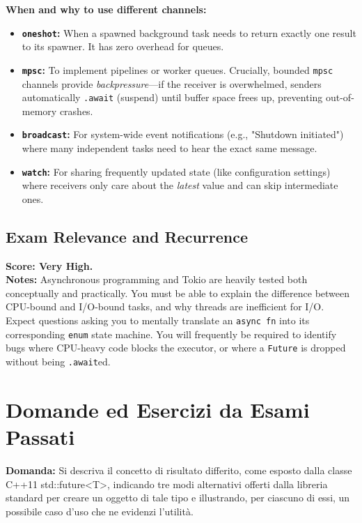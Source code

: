 \begin{usagebox}
\textbf{When and why to use different channels:}
\begin{itemize}
    \item \textbf{\texttt{oneshot}:} When a spawned background task needs to return exactly one result to its spawner. It has zero overhead for queues.
    \item \textbf{\texttt{mpsc}:} To implement pipelines or worker queues. Crucially, bounded \texttt{mpsc} channels provide \textit{backpressure}---if the receiver is overwhelmed, senders automatically \texttt{.await} (suspend) until buffer space frees up, preventing out-of-memory crashes.
    \item \textbf{\texttt{broadcast}:} For system-wide event notifications (e.g., "Shutdown initiated") where many independent tasks need to hear the exact same message.
    \item \textbf{\texttt{watch}:} For sharing frequently updated state (like configuration settings) where receivers only care about the \textit{latest} value and can skip intermediate ones.
\end{itemize}
\end{usagebox}

\subsection*{Exam Relevance and Recurrence}
\textbf{Score: Very High.} \\
\textbf{Notes:} Asynchronous programming and Tokio are heavily tested both conceptually and practically. You must be able to explain the difference between CPU-bound and I/O-bound tasks, and why threads are inefficient for I/O. Expect questions asking you to mentally translate an \texttt{async fn} into its corresponding \texttt{enum} state machine. You will frequently be required to identify bugs where CPU-heavy code blocks the executor, or where a \texttt{Future} is dropped without being \texttt{.await}ed. 

\section{Domande ed Esercizi da Esami Passati}

\begin{exambox}
\textbf{Domanda:} Si descriva il concetto di risultato differito, come esposto dalla classe C++11 std::future<T>, indicando tre modi alternativi offerti dalla libreria standard per creare un oggetto di tale tipo e illustrando, per ciascuno di essi, un possibile caso d'uso che ne evidenzi l'utilità.
\end{exambox}

